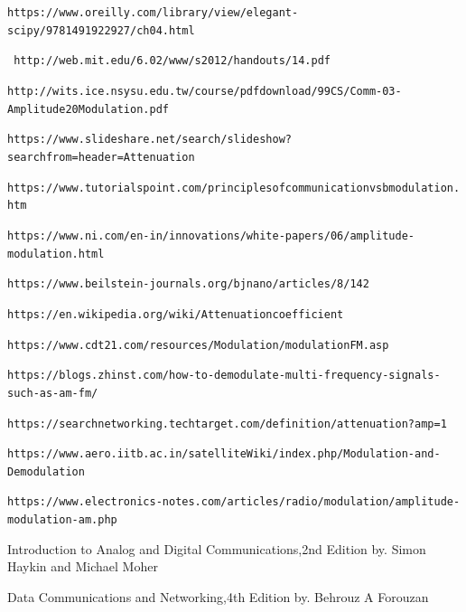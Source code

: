 \documentclass[12pt,a4paper]{article}%
\begin{document}
    \begin{thebibliography}{9}
    	
    	\texttt{https://www.oreilly.com/library/view/elegant-scipy/9781491922927/ch04.html}
    	
    	\texttt{
    		http://web.mit.edu/6.02/www/s2012/handouts/14.pdf}
    	
    	\texttt{http://wits.ice.nsysu.edu.tw/course/pdfdownload/99CS/Comm-03-Amplitude20Modulation.pdf}
    	
    	\texttt{https://www.slideshare.net/search/slideshow?searchfrom=header=Attenuation}
    	
    	\texttt{https://www.tutorialspoint.com/principlesofcommunicationvsbmodulation.htm}
    	
    	\texttt{https://www.ni.com/en-in/innovations/white-papers/06/amplitude-modulation.html}
    	
    	\texttt{https://www.beilstein-journals.org/bjnano/articles/8/142}
    	
    	\texttt{https://en.wikipedia.org/wiki/Attenuationcoefficient}
    	
    	\texttt{https://www.cdt21.com/resources/Modulation/modulationFM.asp}
    	
    	\texttt{https://blogs.zhinst.com/how-to-demodulate-multi-frequency-signals-such-as-am-fm/}
    	
    	\texttt{https://searchnetworking.techtarget.com/definition/attenuation?amp=1}
    	
    	\texttt{https://www.aero.iitb.ac.in/satelliteWiki/index.php/Modulation-and-Demodulation}
    	
    	\texttt{https://www.electronics-notes.com/articles/radio/modulation/amplitude-modulation-am.php}
    	
    	Introduction to Analog and Digital Communications,2nd Edition by. Simon Haykin and Michael Moher
    	
    	Data Communications and Networking,4th Edition by. Behrouz A Forouzan
    \end{thebibliography}
\end{document}
